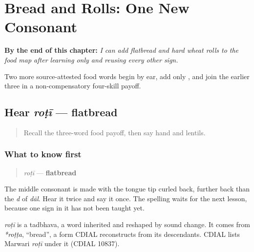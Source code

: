
\chapter{Bread and Rolls: One New Consonant}
\label{ch:mw-food-five}

\begin{chapteropening}
\textbf{By the end of this chapter:} \emph{I can add flatbread and hard wheat rolls to the food map after learning only  and reusing every other sign.}

Two more source-attested food words begin by ear, add only , and join the earlier three in a non-compensatory four-skill payoff.
\end{chapteropening}

\section[roṭī]{Hear \emph{roṭī} — flatbread}

\label{lesson:MW-C19-hear-roti}



\begin{quote}
Recall the three-word food payoff, then say hand and lentils.
\end{quote}

\subsection*{What to know first}
\begin{quote}
\emph{roṭī} — \textbf{flatbread}
\end{quote}

The middle consonant is made with the tongue tip curled back, further back than the \emph{d} of \emph{dāl}. Hear it twice and say it once. The spelling waits for the next lesson, because one sign in it has not been taught yet.

\begin{cousinweb}
\emph{roṭī} is a tadbhava, a word inherited and reshaped by sound change. It comes from \emph{*roṭṭa}, \textquotedblleft{}bread\textquotedblright{}, a form CDIAL reconstructs from its descendants. CDIAL lists Marwari \emph{roṭī} under it (CDIAL 10837).
\end{cousinweb}

